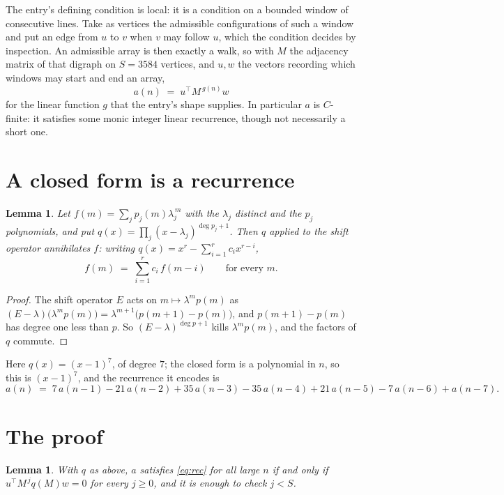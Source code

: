 \documentclass[11pt,a4paper]{article}
\theoremstyle{plain}
\newtheorem{lemma}[theorem]{Lemma}
\theoremstyle{definition}
\begin{document}
The entry's defining condition is local: it is a condition on a bounded window of consecutive lines. Take as vertices the
admissible configurations of such a window and put an edge from $u$ to $v$ when $v$ may
follow $u$, which the condition decides by inspection. An admissible array is then exactly a
walk, so with $M$ the adjacency matrix of that digraph on $S=3584$ vertices, and $u,w$ the
vectors recording which windows may start and end an array,
\[
a(n)\;=\;u^{\!\top}M^{\,g(n)}w
\]
for the linear function $g$ that the entry's shape supplies. In particular $a$ is
$C$-finite: it satisfies some monic integer linear recurrence, though not necessarily a short
one.

\section{A closed form is a recurrence}

\begin{lemma}\label{lem:ann}
Let $f(m)=\sum_{j}p_j(m)\lambda_j^{\,m}$ with the $\lambda_j$ distinct and the $p_j$
polynomials, and put $q(x)=\prod_j(x-\lambda_j)^{\deg p_j+1}$. Then $q$ applied to the shift
operator annihilates $f$: writing $q(x)=x^{r}-\sum_{i=1}^{r}c_ix^{r-i}$,
\[
f(m)\;=\;\sum_{i=1}^{r}c_i\,f(m-i)\qquad\text{for every }m.
\]
\end{lemma}

\begin{proof}
The shift operator $E$ acts on $m\mapsto\lambda^{m}p(m)$ as
$(E-\lambda)\bigl(\lambda^{m}p(m)\bigr)=\lambda^{m+1}\bigl(p(m+1)-p(m)\bigr)$, and
$p(m+1)-p(m)$ has degree one less than $p$. So $(E-\lambda)^{\deg p+1}$ kills
$\lambda^{m}p(m)$, and the factors of $q$ commute.
\end{proof}

Here $q(x)=(x-1)^{7}$, of degree $7$; the closed form is a polynomial in $n$, so this is $(x-1)^{7}$, and the recurrence it encodes is
\begin{equation}\label{eq:rec}
a(n)\;=\;7\,a(n-1) - 21\,a(n-2) + 35\,a(n-3) - 35\,a(n-4) + 21\,a(n-5) - 7\,a(n-6) + a(n-7).
\end{equation}

\section{The proof}

\begin{lemma}\label{lem:crit}
With $q$ as above, $a$ satisfies \eqref{eq:rec} for all large $n$ if and only if
$u^{\!\top}M^{\,j}q(M)w=0$ for every $j\ge0$, and it is enough to check $j<S$.
\end{lemma}
\end{document}
